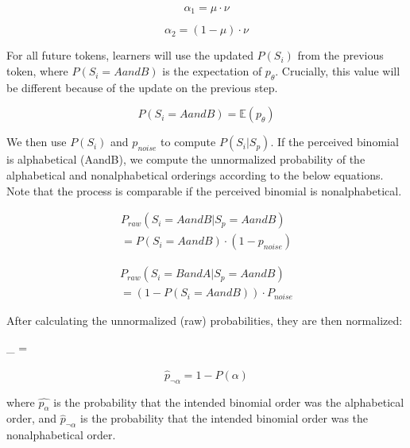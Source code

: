 \documentclass[10pt, letterpaper]{article}
\begin{document}
\begin{equation}
\label{eq:alpha1}
\alpha_1 = \mu \cdot \nu
\end{equation}

\begin{equation}
\label{eq:alpha2}
\alpha_2 = (1-\mu) \cdot \nu
\end{equation}

For all future tokens, learners will use the updated \(P(S_i)\) from the
previous token, where \(P(S_i = AandB)\) is the expectation of
\(p_\theta\). Crucially, this value will be different because of the
update on the previous step.

\begin{equation}
\label{eq:expectationptheta}
P(S_i = AandB) = \mathbb{E}(p_\theta)
\end{equation}

We then use \(P(S_i)\) and \(p_{noise}\) to compute \(P(S_i|S_p)\). If
the perceived binomial is alphabetical (AandB), we compute the
unnormalized probability of the alphabetical and nonalphabetical
orderings according to the below equations. Note that the process is
comparable if the perceived binomial is nonalphabetical.

\begin{multline}
\label{eq:praw}
P_{raw}(S_i = AandB|S_p = AandB) \\ = P(S_i = AandB) \cdot (1 -  p_{noise})
\end{multline}

\begin{multline}
\label{eq:prawtwo}
P_{raw}(S_i = BandA|S_p = AandB) \\ = (1 - P(S_i = AandB)) \cdot P_{noise}
\end{multline}

After calculating the unnormalized (raw) probabilities, they are then
normalized:

\begin{myequation}%
\label{eq:phatalpha}
_{\alpha} =  %
\end{myequation}

\begin{equation}
\label{eq:phatnotalpha}
\hat{p}_{\neg\alpha} = 1 - \hat{P}(\alpha)
\end{equation}

\noindent where \(\hat{p_\alpha}\) is the probability that the intended
binomial order was the alphabetical order, and \(\hat{p}_{\neg\alpha}\)
is the probability that the intended binomial order was the
nonalphabetical order.
\end{document}
